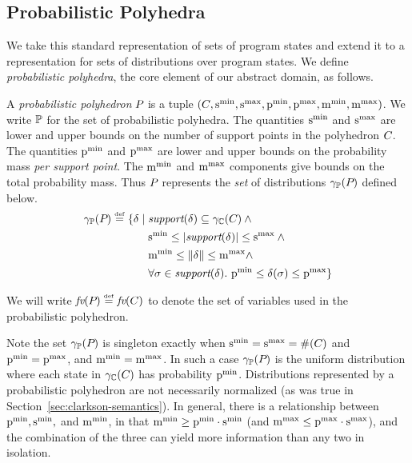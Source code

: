 \subsection{Probabilistic Polyhedra}

We take this standard representation of sets of program states and
extend it to a representation for sets of distributions over program
states.  We define \emph{probabilistic polyhedra}, the core element of
our abstract domain, as follows.

\begin{definition}
A \emph{probabilistic polyhedron} $P_{}$ is a tuple
$(C_{},\mathrm{s}^\mathrm{min}_{}, \mathrm{s}^\mathrm{max}_{}, \mathrm{p}^\mathrm{min}_{}, \mathrm{p}^\mathrm{max}_{}, \mathrm{m}^\mathrm{min}_{}, \mathrm{m}^\mathrm{max}_{})$.  
We write $\mathbb{P}$ for the set of probabilistic polyhedra.  The
quantities $\mathrm{s}^\mathrm{min}_{}$ and $ \mathrm{s}^\mathrm{max}_{}$ are lower and upper bounds on 
the number of support points in the polyhedron $C_{}$.  The quantities
$\mathrm{p}^\mathrm{min}_{} $ and $ \mathrm{p}^\mathrm{max}_{} $ are lower and upper bounds on the
probability mass \emph{per support point}.  The $ \mathrm{m}^\mathrm{min}_{} $ and $
\mathrm{m}^\mathrm{max}_{} $ components give bounds on the total probability mass.  
Thus $P_{}$ represents the \emph{set} of distributions
$\gamma_{\mathbb{P}}(P_{})$ defined below. 
\[
\gamma_{\mathbb{P}}(P_{}) \stackrel{\smash{\scriptscriptstyle \mathrm{def}}}=
\begin{aligned}[t]
\{\delta \mid {} & \textit{support}(\delta) \subseteq \gamma_{\mathbb{C}}(C_{}) \wedge {} \\
  & \mathrm{s}^\mathrm{min}_{} \leq \left| \textit{support}(\delta) \right| \leq \mathrm{s}^\mathrm{max}_{} \wedge {} \\
  & \mathrm{m}^\mathrm{min}_{} \leq \mathord{\parallel}\delta\mathord{\parallel} \leq \mathrm{m}^\mathrm{max}_{} \wedge \\
  & \forall \sigma \in \textit{support}(\delta).\ \mathrm{p}^\mathrm{min}_{} \leq \delta(\sigma) \leq \mathrm{p}^\mathrm{max}_{}\}
\end{aligned}
\]

We will write $ \textit{fv}(P_{}) \stackrel{\smash{\scriptscriptstyle \mathrm{def}}}= \textit{fv}(C) $ to denote the set of variables
used in the probabilistic polyhedron. 

\end{definition}
Note the set $\gamma_{\mathbb{P}}(P_{})$ is singleton exactly when $\mathrm{s}^\mathrm{min}_{} = \mathrm{s}^\mathrm{max}_{}
= \#(C_{})$ and $\mathrm{p}^\mathrm{min}_{} = \mathrm{p}^\mathrm{max}_{}$, and $\mathrm{m}^\mathrm{min}_{} =
\mathrm{m}^\mathrm{max}_{}$.  In such a case $\gamma_{\mathbb{P}}(P_{})$ is the uniform distribution
where each state in $\gamma_{\mathbb{C}}(C_{})$ has probability $\mathrm{p}^\mathrm{min}_{}$.
Distributions represented by a probabilistic polyhedron are not
necessarily normalized (as was true in
Section~\ref{sec:clarkson-semantics}).  In general, there is a
relationship between $\mathrm{p}^\mathrm{min}_{}, \mathrm{s}^\mathrm{min}_{}, $ and $\mathrm{m}^\mathrm{min}_{}$, in that
$\mathrm{m}^\mathrm{min}_{} \geq \mathrm{p}^\mathrm{min}_{} \cdot \mathrm{s}^\mathrm{min}_{}$ (and $\mathrm{m}^\mathrm{max}_{} \leq \mathrm{p}^\mathrm{max}_{} \cdot
\mathrm{s}^\mathrm{max}_{}$), and the combination of the three can yield more information
than any two in isolation.

